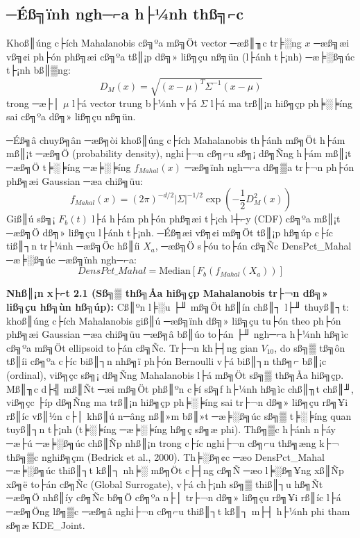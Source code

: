 ﻿\documentclass[../main.tex]{subfiles}
\begin{document}
\subsection{─Éß╗ïnh ngh─⌐a h├¼nh thß╗⌐c}

Khoß║úng c├ích Mahalanobis cß╗ºa mß╗Öt vector ─æß║╖c tr╞░ng $x$ ─æß╗æi vß╗¢i ph├ón phß╗æi cß╗ºa tß║¡p dß╗» liß╗çu nß╗ün (l├ánh t├¡nh) ─æ╞░ß╗úc t├¡nh bß║▒ng:
\begin{equation}
    D_M(x) = \sqrt{(x - \mu)^T \Sigma^{-1} (x - \mu)}
\end{equation}
trong ─æ├│ $\mu$ l├á vector trung b├¼nh v├á $\Sigma$ l├á ma trß║¡n hiß╗çp ph╞░╞íng sai cß╗ºa dß╗» liß╗çu nß╗ün.

─Éß╗â chuyß╗ân ─æß╗òi khoß║úng c├ích Mahalanobis th├ánh mß╗Öt h├ám mß║¡t ─æß╗Ö (probability density), nghi├¬n cß╗⌐u sß╗¡ dß╗Ñng h├ám mß║¡t ─æß╗Ö t╞░╞íng ─æ╞░╞íng $f_{Mahal}(x)$ ─æß╗ïnh ngh─⌐a dß╗▒a tr├¬n ph├ón phß╗æi Gaussian ─æa chiß╗üu:
\begin{equation}
    f_{Mahal}(x) = (2\pi)^{-d/2} |\Sigma|^{-1/2} \exp\left(-\frac{1}{2} D_M^2(x)\right)
\end{equation}
Giß║ú sß╗¡ $F_b(t)$ l├á h├ám ph├ón phß╗æi t├¡ch l┼⌐y (CDF) cß╗ºa mß║¡t ─æß╗Ö dß╗» liß╗çu l├ánh t├¡nh. ─Éß╗æi vß╗¢i mß╗Öt tß║¡p hß╗úp c├íc tiß║┐n tr├¼nh ─æß╗Öc hß║íi $X_a$, ─æß╗Ö s├óu to├án cß╗Ñc DensPct\_Mahal ─æ╞░ß╗úc ─æß╗ïnh ngh─⌐a:
\begin{equation}
    DensPct\_Mahal = \text{Median} \left[ F_b(f_{Mahal}(X_a)) \right]
\end{equation}

\textbf{Nhß║¡n x├⌐t 2.1 (Sß╗▒ thß╗Åa hiß╗çp Mahalanobis tr├¬n dß╗» liß╗çu hß╗ùn hß╗úp):}
Cß║ºn l╞░u ├╜ mß╗Öt hß║ín chß║┐ l├╜ thuyß║┐t: khoß║úng c├ích Mahalanobis giß║ú ─æß╗ïnh dß╗» liß╗çu tu├ón theo ph├ón phß╗æi Gaussian ─æa chiß╗üu ─æß╗â bß║úo to├án ├╜ ngh─⌐a h├¼nh hß╗ìc cß╗ºa mß╗Öt ellipsoid to├án cß╗Ñc. Tr├¬n kh├┤ng gian $V_{10}$, do sß╗▒ tß╗ôn tß║íi cß╗ºa c├íc biß║┐n nhß╗ï ph├ón Bernoulli v├á biß║┐n thß╗⌐ bß║¡c (ordinal), viß╗çc sß╗¡ dß╗Ñng Mahalanobis l├á mß╗Öt sß╗▒ thß╗Åa hiß╗çp. Mß║╖c d├╣ mß║Ñt ─æi mß╗Öt phß║ºn c╞í sß╗ƒ h├¼nh hß╗ìc chß║╖t chß║╜, viß╗çc ├íp dß╗Ñng ma trß║¡n hiß╗çp ph╞░╞íng sai tr├¬n dß╗» liß╗çu rß╗¥i rß║íc vß║½n c├│ khß║ú n─âng nß║»m bß║»t ─æ╞░ß╗úc sß╗▒ t╞░╞íng quan tuyß║┐n t├¡nh (t╞░╞íng ─æ╞░╞íng hß╗ç sß╗æ phi). Thß╗▒c h├ánh n├áy ─æ├ú ─æ╞░ß╗úc chß║Ñp nhß║¡n trong c├íc nghi├¬n cß╗⌐u thß╗æng k├¬ thß╗▒c nghiß╗çm (Bedrick et al., 2000). Th╞░ß╗¢c ─æo DensPct\_Mahal ─æ╞░ß╗úc thiß║┐t kß║┐ nh╞░ mß╗Öt c├┤ng cß╗Ñ ─æo l╞░ß╗¥ng xß║Ñp xß╗ë to├án cß╗Ñc (Global Surrogate), v├á ch├¡nh sß╗▒ thiß║┐u hß╗Ñt ─æß╗Ö nhß║íy cß╗Ñc bß╗Ö cß╗ºa n├│ tr├¬n dß╗» liß╗çu rß╗¥i rß║íc l├á ─æß╗Öng lß╗▒c ─æß╗â nghi├¬n cß╗⌐u thiß║┐t kß║┐ m├┤ h├¼nh phi tham sß╗æ KDE\_Joint.
\end{document}
